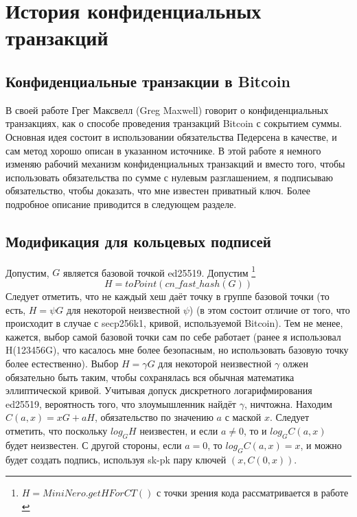 \documentclass{mrl}
\theoremstyle{definition}
\numberwithin{thm}{section}
\begin{document}
\section{\label{sec:Background-on-ConfidentialT}История конфиденциальных транзакций}

\subsection{Конфиденциальные транзакции в Bitcoin}

В своей работе \cite{GM} Грег Максвелл (Greg Maxwell) говорит о конфиденциальных транзакциях, как о способе проведения транзакций Bitcoin с сокрытием суммы. Основная идея состоит в использовании обязательства Педерсена в качестве, и сам метод хорошо описан в указанном источнике. В этой работе я немного изменяю рабочий механизм конфиденциальных транзакций и вместо того, чтобы использовать обязательства по сумме с нулевым разглашением, я подписываю обязательство, чтобы доказать, что мне известен приватный ключ. Более подробное описание приводится в следующем разделе.

\subsection{Модификация для кольцевых подписей}

Допустим, $G$ является базовой точкой ed25519. Допустим \footnote{$H=MiniNero.getHForCT()$ с точки зрения кода рассматривается в работе \cite{Snoe}}
\[
H=toPoint\left(cn\_fast\_hash\left(G\right)\right)
\]
Следует отметить, что не каждый хеш даёт точку в группе базовой точки (то есть, $H=\psi G$ для некоторой неизвестной $\psi$) (в этом состоит отличие от того, что происходит в случае с secp256k1, кривой, используемой Bitcoin). Тем не менее, кажется, выбор самой базовой точки сам по себе работает (ранее я использовал H(123456G), что касалось мне более безопасным, но использовать базовую точку более естественно).
Выбор $H = \gamma G$ для некоторой неизвестной $\gamma$ олжен обязательно быть таким, чтобы сохранялась вся обычная математика эллиптической кривой.
Учитывая допуск дискретного логарифмирования ed25519, вероятность того, что злоумышленник найдёт $\gamma$, ничтожна. Находим $C\left(a,x\right)=xG+aH$, обязательство по значению $a$ с маской $x$. Следует отметить, что поскольку $log_{G}H$ неизвестен, и если $a\neq0$, то и $log_{G}C\left(a,x\right)$ будет неизвестен. С другой стороны, если $a=0$, то $log_{G}C\left(a,x\right)=x$, и можно будет создать подпись, используя sk-pk пару ключей $\left(x,C\left(0,x\right)\right).$
\end{document}
